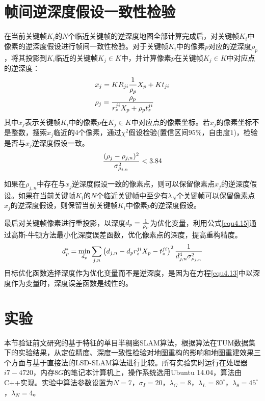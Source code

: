 \section{帧间逆深度假设一致性检验}
在当前关键帧$K_i$的$N$个临近关键帧的逆深度地图全部计算完成后，对关键帧$K_i$中像素的逆深度假设进行帧间一致性检验。对于关键帧$K_i$中的像素$p$对应的逆深度$\rho_p$，将其投影到$K_i$临近的关键帧$K_j \in K$中，并计算像素$p$在关键帧$K_j \in K$中对应点的逆深度：
\begin{equation}
\label{equ4.13}
\begin{aligned}
& x_j = K R_{ji} {1 \over \rho_p} X_p + Kt_{ji} \\ 
& \rho_j = { \rho_p \over r_z^{ji}X_p+\rho_p t_z^{ji} }
\end{aligned}
\end{equation}
其中$x_{j}$表示关键帧$K_i$中的像素$p$在$K_j \in K$中对应点的像素坐标。若$x_j$的像素坐标不是整数，搜索$x_{j}$临近的4个像素，通过$\chi^2$假设检验(置信区间$95\%$，自由度$1$)，检验是否与$x_j$逆深度假设一致。
\begin{equation}
\label{equ4.14}
{ (\rho_j - \rho_{j,n})^2 \over \sigma_{\rho_{j,n}}^2 } < 3.84
\end{equation}

如果在$\rho_{j,n}$中存在与$x_j$逆深度假设一致的像素点，则可以保留像素点$x_j$的逆深度假设。如果在当前关键帧$K_i$的$N$个临近关键帧中至少有$\lambda_N$个关键帧可以保留像素点$x_j$的逆深度假设，则保留当前关键帧$K_i$中像素$p$的逆深度假设。

最后对关键帧像素进行重投影，以深度$d_p = { 1 \over \rho_p }$为优化变量，利用公式\eqref{equ4.15}通过高斯-牛顿方法最小化深度误差函数，优化像素点的深度，提高重构精度。
\begin{equation}
\label{equ4.15}
d_p^* = \min_{d_p} \sum\limits_{j,n} \left( d_{j,n} - d_p r_z^{ji} X_p - t_z^{ji}  \right)^2  {1 \over {d_{j,n}^4 \sigma_{\rho_{j,n}}^2 }}
\end{equation}
目标优化函数选择深度作为优化变量而不是逆深度，是因为在方程\eqref{equ4.13}中以深度作为变量时，深度误差函数是线性的。


\section{实验}
本节验证前文研究的基于特征的单目半稠密SLAM算法，根据算法在TUM数据集下的实验结果，从定位精度、深度一致性检验对地图重构的影响和地图重建效果三个方面与基于直接法的LSD-SLAM算法进行比较。所有实验实时运行在处理器$i7-4720$，内存$8G$的笔记本计算机上，操作系统选用Ubuntu 14.04，算法由C++实现。实验中算法参数设置为$N=7$，$\sigma_I=20$，$\lambda_G=8$，$\lambda_L = 80^\circ$，$\lambda_\theta=45^\circ$，$\lambda_N=4$。

